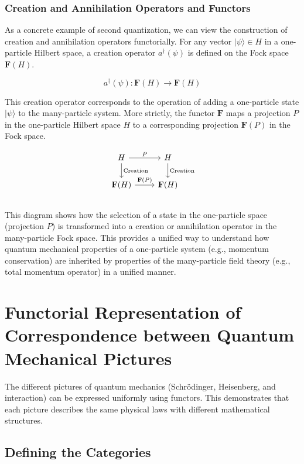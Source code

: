 \documentclass[uplatex,a4j,12pt,dvipdfmx]{jsarticle}
\begin{document}
\subsubsection{Creation and Annihilation Operators and Functors}

As a concrete example of second quantization, we can view the construction of creation and annihilation operators functorially. For any vector $|\psi\rangle \in H$ in a one-particle Hilbert space, a creation operator $a^\dagger(\psi)$ is defined on the Fock space $\mathbf{F}(H)$.

$$a^\dagger(\psi) : \mathbf{F}(H) \to \mathbf{F}(H)$$

This creation operator corresponds to the operation of adding a one-particle state $|\psi\rangle$ to the many-particle system. More strictly, the functor $\mathbf{F}$ maps a projection $P$ in the one-particle Hilbert space $H$ to a corresponding projection $\mathbf{F}(P)$ in the Fock space.

$$
	\begin{tikzcd}
		H \arrow[r, "P"] \arrow[d, "\text{Creation}"] & H \arrow[d, "\text{Creation}"] \\
		\mathbf{F}(H) \arrow[r, "\mathbf{F}(P)"] & \mathbf{F}(H)
	\end{tikzcd}
$$

${}$

This diagram shows how the selection of a state in the one-particle space (projection $P$) is transformed into a creation or annihilation operator in the many-particle Fock space. This provides a unified way to understand how quantum mechanical properties of a one-particle system (e.g., momentum conservation) are inherited by properties of the many-particle field theory (e.g., total momentum operator) in a unified manner.






\section{Functorial Representation of Correspondence between Quantum Mechanical Pictures}

The different pictures of quantum mechanics (Schrödinger, Heisenberg, and interaction) can be expressed uniformly using functors. This demonstrates that each picture describes the same physical laws with different mathematical structures.

\subsection{Defining the Categories}
\end{document}
